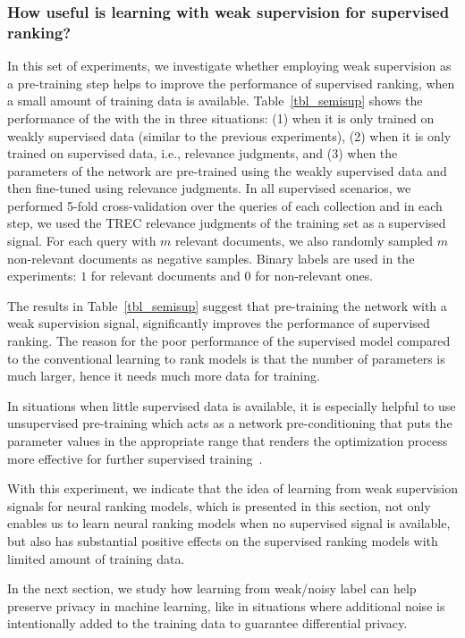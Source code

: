 
\subsubsection{How useful is learning with weak supervision for supervised ranking?}
%
In this set of experiments, we investigate whether employing weak supervision as a pre-training step helps to improve the performance of supervised ranking, when a small amount of training data is available. Table~\ref{tbl_semisup} shows the performance of the \modelthree with the \feedthree in three situations: (1) when it is only trained on weakly supervised data (similar to the previous experiments), (2) when it is only trained on supervised data, i.e., relevance judgments, and (3) when the parameters of the network are pre-trained using the weakly supervised data and then fine-tuned using relevance judgments.
%
In all supervised scenarios, we performed 5-fold cross-validation over the queries of each collection and in each step, we used the TREC relevance judgments of the training set as a supervised signal. For each query with $m$ relevant documents, we also randomly sampled $m$ non-relevant documents as negative samples. Binary labels are used in the experiments: $1$ for relevant documents and $0$ for non-relevant ones.

The results in Table~\ref{tbl_semisup} suggest that pre-training the network with a weak supervision signal, significantly improves the performance of supervised ranking.
%
The reason for the poor performance of the supervised model compared to the conventional learning to rank models is that the number of parameters is much larger, hence it needs much more data for training.

In situations when little supervised data is available, it is especially helpful to use unsupervised pre-training which acts as a network pre-conditioning that puts the parameter values in the appropriate range that renders the optimization process more effective for further supervised training~\citep{Rrhan:2010}.

With this experiment, we indicate that the idea of learning from weak supervision signals for neural ranking models, which is presented in this section, not only enables us to learn neural ranking models when no supervised signal is available, but also has substantial positive effects on the supervised ranking models with limited amount of training data. 

In the next section, we study how learning from weak/noisy label can help preserve privacy in machine learning, like in situations where additional noise is intentionally added to the training data to guarantee differential privacy.  